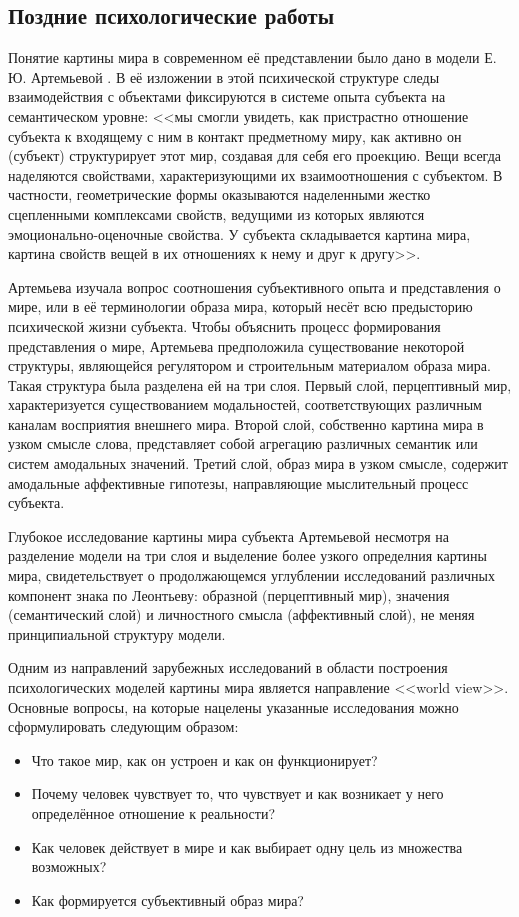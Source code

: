 \subsection{Поздние психологические работы} \label{subsect1_1_1}

Понятие картины мира в современном её представлении было дано в модели Е.\,Ю. Артемьевой \cite{Artemyeva1980}. В её изложении в этой психической структуре следы взаимодействия с объектами фиксируются в системе опыта субъекта на семантическом уровне: <<мы смогли увидеть, как пристрастно отношение субъекта к входящему с ним в контакт предметному миру, как активно он (субъект) структурирует этот мир, создавая для себя его проекцию. Вещи всегда наделяются свойствами, характеризующими их взаимоотношения с субъектом. В частности, геометрические формы оказываются наделенными жестко сцепленными комплексами свойств, ведущими из которых являются эмоционально-оценочные свойства. У субъекта складывается картина мира, картина свойств вещей в их отношениях к нему и друг к другу>>. 

Артемьева изучала вопрос соотношения субъективного опыта и представления о мире, или в её терминологии образа мира, который несёт всю предысторию психической жизни субъекта. Чтобы объяснить процесс формирования представления о мире, Артемьева предположила существование некоторой структуры, являющейся регулятором и строительным материалом образа мира. Такая структура была разделена ей на три слоя. Первый слой, перцептивный мир, характеризуется существованием модальностей, соответствующих различным каналам восприятия внешнего мира. Второй слой, собственно картина мира в узком смысле слова, представляет собой агрегацию различных семантик или систем амодальных значений. Третий слой, образ мира в узком смысле, содержит амодальные аффективные гипотезы, направляющие мыслительный процесс субъекта.

Глубокое исследование картины мира субъекта Артемьевой несмотря на разделение модели на три слоя и выделение более узкого определния картины мира, свидетельствует о продолжающемся углублении исследований различных компонент знака по Леонтьеву: образной (перцептивный мир), значения (семантический слой) и личностного смысла (аффективный слой), не меняя принципиальной структуру модели.

Одним из направлений зарубежных исследований в области построения психологических моделей картины мира является направление <<world view>>. Основные вопросы, на которые нацелены указанные исследования можно сформулировать следующим образом: 
\begin{itemize}
	\item Что такое мир, как он устроен и как он функционирует? 
	\item Почему человек чувствует то, что чувствует и как возникает у него определённое отношение к реальности? 
	\item Как человек действует в мире и как выбирает одну цель из множества возможных? 
	\item Как формируется субъективный образ мира?
\end{itemize}
 

